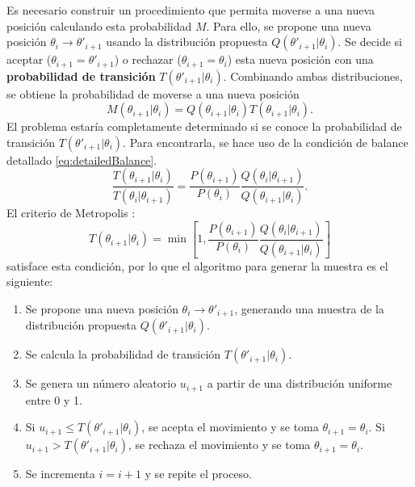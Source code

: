	Es necesario construir un procedimiento que permita moverse a una nueva posición calculando esta probabilidad $M$. Para ello, se propone una nueva posición $\theta_i\rightarrow\theta'_{i+1}$ usando la distribución propuesta $Q(\theta'_{i+1}|\theta_i)$. Se decide si aceptar ($\theta_{i+1}=\theta'_{i+1}$) o rechazar ($\theta_{i+1}=\theta_{i}$) esta nueva posición con una \textbf{probabilidad de transición} $T(\theta'_{i+1}|\theta_i)$. Combinando ambas distribuciones, se obtiene la probabilidad de moverse a una nueva posición
	$$M(\theta_{i+1}|\theta_i)=Q(\theta_{i+1}|\theta_i)T(\theta_{i+1}|\theta_i).$$
	El problema estaría completamente determinado si se conoce la probabilidad de transición $T(\theta'_{i+1}|\theta_i)$. Para encontrarla, se hace uso de la condición de balance detallado \eqref{eq:detailedBalance}.
	$$\frac{T(\theta_{i+1}|\theta_i)}{T(\theta_{i}|\theta_{i+1})}=\frac{P(\theta_{i+1})}{P(\theta_i)}\frac{Q(\theta_{i}|\theta_{i+1})}{Q(\theta_{i+1}|\theta_i)}.$$
	El criterio de Metropolis \cite{doi:10.1063/1.1699114}:
	$$T(\theta_{i+1}|\theta_i)=\min \left[ 1, \frac{P(\theta_{i+1})}{P(\theta_i)}\frac{Q(\theta_{i}|\theta_{i+1})}{Q(\theta_{i+1}|\theta_i)} \right]$$
	satisface esta condición, por lo que el algoritmo para generar la muestra es el siguiente:
	\begin{enumerate}
		\item Se propone una nueva posición $\theta_i\rightarrow\theta'_{i+1}$, generando una muestra de la distribución propuesta $Q(\theta'_{i+1}|\theta_i)$.
		\item Se calcula la probabilidad de transición $T(\theta'_{i+1}|\theta_i)$.
		\item Se genera un número aleatorio $u_{i+1}$ a partir de una distribución uniforme entre 0 y 1.
		\item Si $u_{i+1}\leq T(\theta'_{i+1}|\theta_i)$, se acepta el movimiento y se toma $\theta_{i+1}=\theta_i$. Si $u_{i+1}> T(\theta'_{i+1}|\theta_i)$, se rechaza el movimiento y se toma $\theta_{i+1}=\theta_i$.
		\item Se incrementa $i=i+1$ y se repite el proceso.
	\end{enumerate}